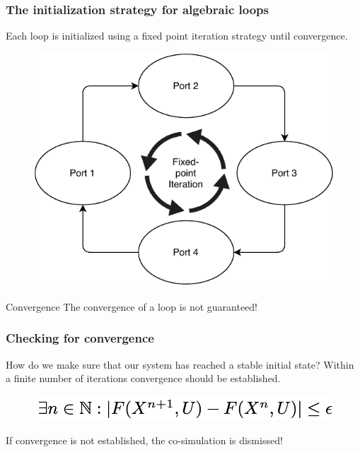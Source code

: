 \documentclass{beamer}
\begin{document}
\begin{frame}
\frametitle{The initialization strategy for algebraic loops}
Each loop is initialized using a fixed point iteration strategy until convergence.
    
\begin{figure}
    \centering
    \includegraphics[scale=0.6]{images/ExpansionPlugin-Page-4.pdf}
\end{figure}
    
\begin{alertblock}{Convergence}
    The convergence of a loop is not guaranteed!
\end{alertblock}
    
\end{frame}

\begin{frame}
\frametitle{Checking for convergence}
How do we make sure that our system has reached a stable initial state?
Within a finite number of iterations convergence should  be established.
\begin{figure}
    \centering
    \includegraphics[scale=0.3]{images/Screenshot 2020-09-09 at 20.51.28.png}
\end{figure}

If convergence is not established, the co-simulation is dismissed!
\end{frame}
\end{document}
